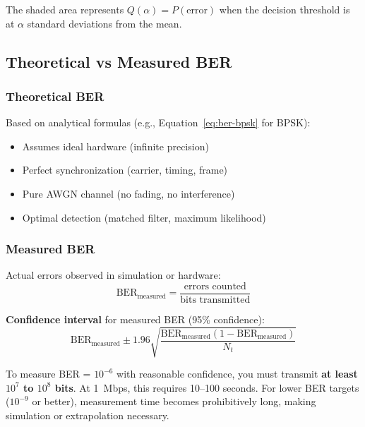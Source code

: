 The shaded area represents $Q(\alpha) = P(\text{error})$ when the decision threshold is at $\alpha$ standard deviations from the mean.

\subsection{Theoretical vs Measured BER}

\subsubsection{Theoretical BER}

Based on analytical formulas (e.g., Equation~\ref{eq:ber-bpsk} for BPSK):
\begin{itemize}
\item Assumes ideal hardware (infinite precision)
\item Perfect synchronization (carrier, timing, frame)
\item Pure AWGN channel (no fading, no interference)
\item Optimal detection (matched filter, maximum likelihood)
\end{itemize}

\subsubsection{Measured BER}

Actual errors observed in simulation or hardware:
\begin{equation}
\mathrm{BER}_{\mathrm{measured}} = \frac{\text{errors counted}}{\text{bits transmitted}}
\label{eq:ber-measured}
\end{equation}

\textbf{Confidence interval} for measured BER (95\% confidence):
\begin{equation}
\mathrm{BER}_{\mathrm{measured}} \pm 1.96\sqrt{\frac{\mathrm{BER}_{\mathrm{measured}}(1-\mathrm{BER}_{\mathrm{measured}})}{N_t}}
\label{eq:ber-confidence}
\end{equation}

\begin{warningbox}
To measure BER = $10^{-6}$ with reasonable confidence, you must transmit \textbf{at least $10^7$ to $10^8$ bits}. At 1~Mbps, this requires 10--100 seconds. For lower BER targets ($10^{-9}$ or better), measurement time becomes prohibitively long, making simulation or extrapolation necessary.
\end{warningbox}

